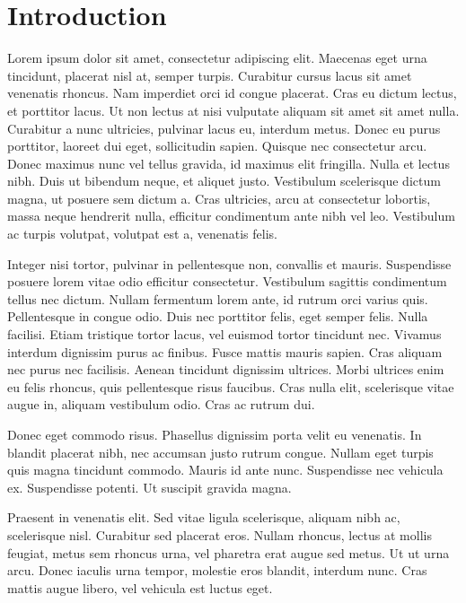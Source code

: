 \chapter{Introduction}
 Lorem ipsum dolor sit amet, consectetur adipiscing elit. Maecenas eget urna tincidunt, placerat nisl at, semper turpis. Curabitur cursus lacus sit amet venenatis rhoncus. Nam imperdiet orci id congue placerat. Cras eu dictum lectus, et porttitor lacus. Ut non lectus at nisi vulputate aliquam sit amet sit amet nulla. Curabitur a nunc ultricies, pulvinar lacus eu, interdum metus. Donec eu purus porttitor, laoreet dui eget, sollicitudin sapien. Quisque nec consectetur arcu. Donec maximus nunc vel tellus gravida, id maximus elit fringilla. Nulla et lectus nibh. Duis ut bibendum neque, et aliquet justo. Vestibulum scelerisque dictum magna, ut posuere sem dictum a. Cras ultricies, arcu at consectetur lobortis, massa neque hendrerit nulla, efficitur condimentum ante nibh vel leo. Vestibulum ac turpis volutpat, volutpat est a, venenatis felis.

Integer nisi tortor, pulvinar in pellentesque non, convallis et mauris. Suspendisse posuere lorem vitae odio efficitur consectetur. Vestibulum sagittis condimentum tellus nec dictum. Nullam fermentum lorem ante, id rutrum orci varius quis. Pellentesque in congue odio. Duis nec porttitor felis, eget semper felis. Nulla facilisi. Etiam tristique tortor lacus, vel euismod tortor tincidunt nec. Vivamus interdum dignissim purus ac finibus. Fusce mattis mauris sapien. Cras aliquam nec purus nec facilisis. Aenean tincidunt dignissim ultrices. Morbi ultrices enim eu felis rhoncus, quis pellentesque risus faucibus. Cras nulla elit, scelerisque vitae augue in, aliquam vestibulum odio. Cras ac rutrum dui.

Donec eget commodo risus. Phasellus dignissim porta velit eu venenatis. In blandit placerat nibh, nec accumsan justo rutrum congue. Nullam eget turpis quis magna tincidunt commodo. Mauris id ante nunc. Suspendisse nec vehicula ex. Suspendisse potenti. Ut suscipit gravida magna.

Praesent in venenatis elit. Sed vitae ligula scelerisque, aliquam nibh ac, scelerisque nisl. Curabitur sed placerat eros. Nullam rhoncus, lectus at mollis feugiat, metus sem rhoncus urna, vel pharetra erat augue sed metus. Ut ut urna arcu. Donec iaculis urna tempor, molestie eros blandit, interdum nunc. Cras mattis augue libero, vel vehicula est luctus eget.
